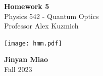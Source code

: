 \documentclass[11pt, oneside]{book}
\theoremstyle{break}
\theoremstyle{break}
\begin{document}
	\begin{titlepage}
		\begin{center}
			\vspace*{0.5cm}
			\Huge \color{red}
				\textbf{Homework 5}\\
			\vspace{0.5cm}			
			\Large \color{black}
			Physics 542 - Quantum Optics\\
			Professor Alex Kuzmich
			\vspace{1.5cm}

			\texttt{[image: hmm.pdf]}
			
			
			\vspace{2cm}
			\LARGE
				\textbf{Jinyan Miao}\\
				\hfill\break
				\LARGE Fall 2023\\
			\vspace{1cm}

		\vspace*{\fill}
		\end{center}			
	\end{titlepage}
\end{document}
